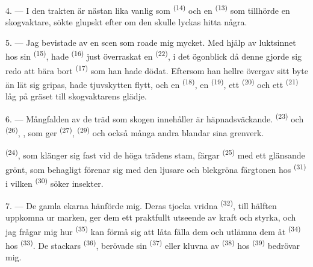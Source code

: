 4. --- I den trakten är  nästan lika vanlig som
 \textsuperscript{(14)} och en 
\textsuperscript{(13)} som tillhörde en skogvaktare, sökte glupskt efter om den
skulle lyckas hitta några.

\VUsaut{3.0mm}
\VUsaut{3.0mm}

5. --- Jag bevistade  av en scen som roade mig mycket. Med hjälp
av luktsinnet hos sin  \textsuperscript{(15)}, hade
 \textsuperscript{(16)} just överraskat en
 \textsuperscript{(22)}, i det ögonblick då denne gjorde sig
redo att bära bort  \textsuperscript{(17)} som han hade
dödat. Eftersom han hellre övergav sitt byte än lät sig gripas, hade tjuvskytten
flytt, och en  \textsuperscript{(18)}, en 
\textsuperscript{(19)}, ett  \textsuperscript{(20)} och ett
 \textsuperscript{(21)} låg på gräset till skogvaktarens glädje.

6. --- Mångfalden av de träd som skogen innehåller är häpnadsväckande.
 \textsuperscript{(23)} och 
\textsuperscript{(26)}, , som ger 
\textsuperscript{(27)},  \textsuperscript{(29)} och också många
andra blandar sina grenverk.

 \textsuperscript{(24)}, som klänger sig fast vid de höga
trädens stam, färgar  \textsuperscript{(25)} med ett glänsande
grönt, som behagligt förenar sig med den ljusare och blekgröna färgtonen hos
 \textsuperscript{(31)} i vilken 
\textsuperscript{(30)} söker insekter.

\VUsaut{3.0mm}
\VUsaut{3.0mm}

7. --- De gamla ekarna hänförde mig. Deras tjocka vridna 
\textsuperscript{(32)}, till hälften uppkomna ur marken, ger dem ett praktfullt
utseende av kraft och styrka, och jag frågar mig hur 
\textsuperscript{(35)} kan förmå sig att låta fälla dem och utlämna dem åt
 \textsuperscript{(34)} hos 
\textsuperscript{(33)}. De stackars  \textsuperscript{(36)},
berövade sin  \textsuperscript{(37)} eller kluvna av
 \textsuperscript{(38)} hos 
\textsuperscript{(39)} bedrövar mig.


